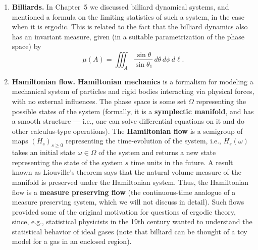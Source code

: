 \documentclass[12pt]{article}
\newcommand{\Z}{\mathbb{Z}}
\theoremstyle{example}
\begin{document}
\begin{enumerate}[1.]
One of the many (ultimately unsuccessful) attempts to study the problem was based on the beautiful observation that this dynamical system can be turned into a measure preserving system, by extending its domain of definition to the ring $\textbf{Z}_2$ of \textbf{$2$-adic integers}. This is an extension of the usual ring $\Z$ of integers in which every element has a binary expansion that extends \emph{infinitely far to the left} (instead of to the right as a real number would). That is, a dyadic integer is a formal expression of the form
$$ a_0 + 2\cdot a_1 + 4\cdot a_2 + 8\cdot a_3 + \ldots + 2^n a_n + \ldots = \sum_{n=0}^\infty a_n 2^n
$$
where $a_0,a_1,a_2,\ldots\in \{0,1\}$.
It can be shown that one can do algebra, and even an exotic form of calculus, on these numbers (and more generally over similar sets of numbers in which the binary expansion is replaced by a base-$p$ expansion where $p$ is an arbitrary prime number --- these are the so-called \textbf{$p$-adic integers}). Since the notion of the parity of a number extends to $2$-adic integers, the $3x+1$ map $T$ extends in an obvious way to a map $\tilde{T}:\mathbf{Z}_2\to\mathbf{Z}_2$. It can be shown that $\tilde{T}$ preserves the natural volume measure of $\textbf{Z}_2$. For more information, see Wikipedia or the article \emph{The $3x+1$ problem and its generalizations}, by J.~C.~Lagarias (\textit{American Math. Monthly} 92 (1985), 3--23).


\item \textbf{Billiards.} In Chapter~5 we discussed billiard dynamical systems, and mentioned a formula on the limiting statistics of such a system, in the case when it is ergodic. This is related to the fact that the billiard dynamics also has an invariant measure, given (in a suitable parametrization of the phase space) by
$$
\mu(A) = \iiint_A \frac{\sin \theta}{\sin\theta_1} \,d\theta\,d\phi\,d\ell.
$$

\item \textbf{Hamiltonian flow.} \textbf{Hamiltonian mechanics} is a formalism for modeling a mechanical system of particles and rigid bodies interacting via physical forces, with no external influences. The phase space is some set $\Omega$ representing the possible states of the system (formally, it is a \textbf{symplectic manifold}, and has a smooth structure --- i.e.,  one can solve differential equations on it and do other calculus-type operations). The \textbf{Hamiltonian flow} is a semigroup of maps $(H_s)_{s\ge 0}$ representing the time-evolution of the system, i.e., $H_s(\omega)$ takes an initial state $\omega\in\Omega$ of the system and returns a new state representing the state of the system $s$ time units in the future. A result known as Liouville's theorem says that the natural volume measure of the manifold is preserved under the Hamiltonian system. Thus, the Hamiltonian flow is a \textbf{measure preserving flow} (the continuous-time analogue of a measure preserving system, which we will not discuss in detail). Such flows provided some of the original motivation for questions of ergodic theory, since, e.g., statistical physicists in the 19th century wanted to understand the statistical behavior of ideal gases (note that billiard can be thought of a toy model for a gas in an enclosed region).


\end{enumerate}
\end{document}

